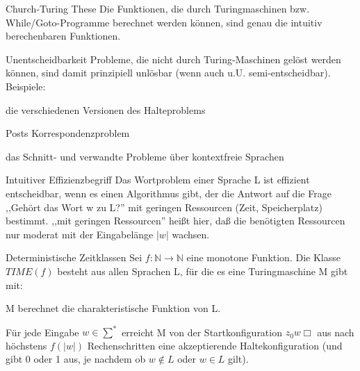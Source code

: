 \documentclass[avery5371, frame]{flashcards}
\begin{document}
\begin{flashcard}[Definition]{ Church-Turing These}
    Die Funktionen, die durch Turingmaschinen bzw. While/Goto-Programme berechnet werden können, sind genau die intuitiv berechenbaren Funktionen.
\end{flashcard}

\begin{flashcard}[Definition]{Unentscheidbarkeit}
    Probleme, die nicht durch Turing-Maschinen gelöst werden können, sind damit prinzipiell unlösbar (wenn auch u.U. semi-entscheidbar). Beispiele:
    \begin{itemize*}
        \item die verschiedenen Versionen des Halteproblems
        \item Posts Korrespondenzproblem
        \item das Schnitt- und verwandte Probleme über kontextfreie Sprachen
    \end{itemize*}
\end{flashcard}

\begin{flashcard}[Definition]{Intuitiver Effizienzbegriff}
    Das Wortproblem einer Sprache L ist effizient entscheidbar, wenn es einen Algorithmus gibt, der die Antwort auf die Frage ,,Gehört das Wort w zu L?'' mit geringen Ressourcen (Zeit, Speicherplatz) bestimmt. ,,mit geringen Ressourcen'' heißt hier, daß die benötigten Ressourcen nur moderat mit der Eingabelänge $|w|$ wachsen.
\end{flashcard}

\begin{flashcard}[Definition]{Deterministische Zeitklassen}
    Sei $f:\mathbb{N}\rightarrow\mathbb{N}$ eine monotone Funktion. Die Klasse $TIME(f)$ besteht aus allen Sprachen L, für die es eine Turingmaschine M gibt mit:
    \begin{itemize*}
        \item M berechnet die charakteristische Funktion von L.
        \item Für jede Eingabe $w\in\sum^*$ erreicht M von der Startkonfiguration $z_0 w\Box$ aus nach höchstens $f(|w|)$ Rechenschritten eine akzeptierende Haltekonfiguration (und gibt 0 oder 1 aus, je nachdem ob $w\not\in L$ oder $w\in L$ gilt).
    \end{itemize*}
\end{flashcard}
\end{document}
